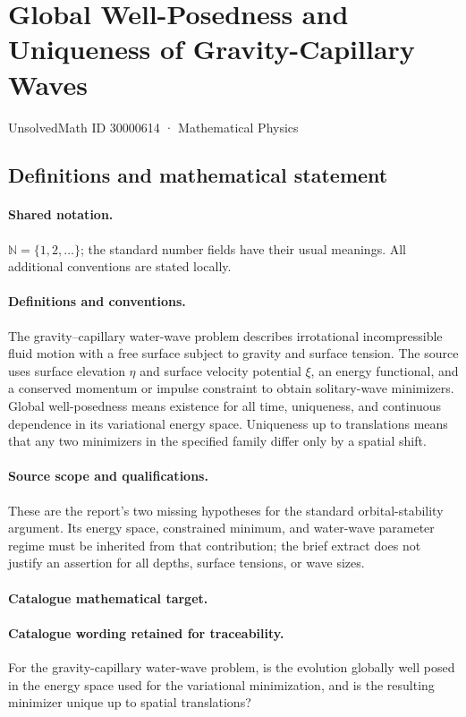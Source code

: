 \documentclass[11pt]{article}
\begin{document}
\setcounter{section}{30000613}
\section{Global Well-Posedness and Uniqueness of Gravity-Capillary Waves}\label{30000614}
{\small UnsolvedMath ID 30000614 · Mathematical Physics}
\subsection{Definitions and mathematical statement}

\paragraph{Shared notation.}$\mathbb N=\{1,2,\ldots\}$; the standard number fields have their usual meanings. All additional conventions are stated locally.


\paragraph{Definitions and conventions.} The gravity--capillary water-wave problem describes irrotational incompressible fluid motion with a free surface subject to gravity and surface tension. The source uses surface elevation $\eta$ and surface velocity potential $\xi$, an energy functional, and a conserved momentum or impulse constraint to obtain solitary-wave minimizers. Global well-posedness means existence for all time, uniqueness, and continuous dependence in its variational energy space. Uniqueness up to translations means that any two minimizers in the specified family differ only by a spatial shift.

\paragraph{Source scope and qualifications.} These are the report's two missing hypotheses for the standard orbital-stability argument. Its energy space, constrained minimum, and water-wave parameter regime must be inherited from that contribution; the brief extract does not justify an assertion for all depths, surface tensions, or wave sizes.

\paragraph{Catalogue mathematical target.}
\paragraph{Catalogue wording retained for traceability.}
For the gravity-capillary water-wave problem, is the evolution globally well posed in the energy space used for the variational minimization, and is the resulting minimizer unique up to spatial translations?
\end{document}
